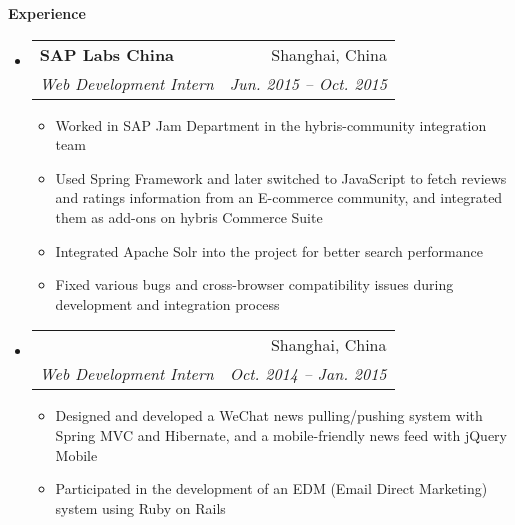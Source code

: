 \documentclass[letterpaper,11pt]{article}
\makeatletter
\newcommand{\resitem}[1]{\item #1 \vspace{-2pt}}
\newcommand{\resheading}[1]{{\large \colorbox{mygrey}{\begin{minipage}{\textwidth}{\textbf{#1 \vphantom{p\^{E}}}}\end{minipage}}}}
\newcommand{\ressubheading}[4]{
\begin{tabular*}{6.5in}{l@{\extracolsep{\fill}}r}
    \textbf{#1} & #2 \\
    \textit{#3} & \textit{#4} \\
\end{tabular*}\vspace{-6pt}}
\makeatother
\begin{document}
    \resheading{Experience}


    \begin{itemize}
        \item\ressubheading
        {SAP Labs China}
        {Shanghai, China}
        {Web Development Intern}{Jun. 2015 -- Oct. 2015}
        {\footnotesize
        \begin{itemize}
            \resitem{Worked in SAP Jam Department in the hybris-community integration team}
            \resitem{Used Spring Framework and later switched to JavaScript to fetch reviews
            and ratings information from an E-commerce community, and
            integrated them as add-ons on hybris Commerce Suite}
            \resitem{Integrated Apache Solr into the project for better search performance}
            \resitem{Fixed various bugs and cross-browser compatibility issues during
            development and integration process}
        \end{itemize}
        }


        \item
        \ressubheading
        {\href
        {http://www.vsc.com}
        {Venus Software Corporation}
        }
        {Shanghai, China}
        {Web Development Intern}
        {Oct. 2014 -- Jan. 2015}
        {\footnotesize
        \begin{itemize}
            \resitem{Designed and developed a WeChat news pulling/pushing system with Spring
            MVC and Hibernate, and a mobile-friendly news feed with jQuery Mobile}
            \resitem{Participated in the development of an EDM (Email Direct Marketing)
            system using Ruby on Rails}
        \end{itemize}
        }

    \end{itemize}
\end{document}

